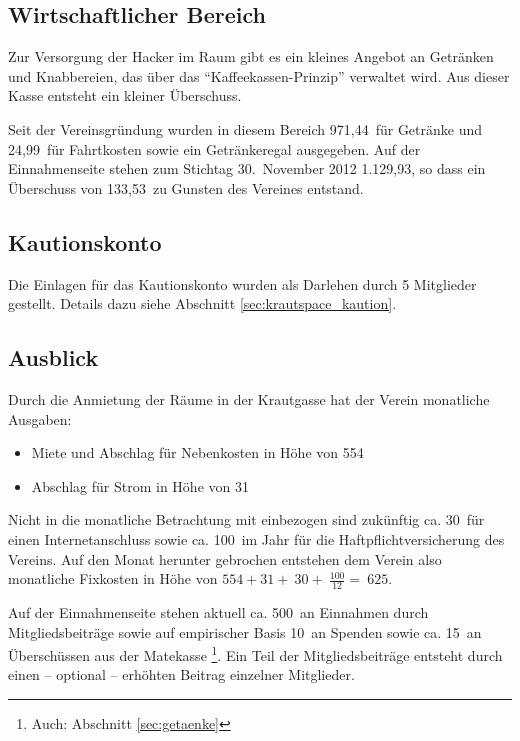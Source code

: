 \documentclass[10pt,DIV16]{scrartcl}
\begin{document}
\subsection{Wirtschaftlicher Bereich}

Zur Versorgung der Hacker im Raum gibt es ein kleines Angebot an
Getränken und Knabbereien, das über das "`Kaffeekassen-Prinzip"'
verwaltet wird. Aus dieser Kasse entsteht ein kleiner Überschuss.

Seit der Vereinsgründung wurden in diesem Bereich 971,44\EUR\ für
Getränke und 24,99\EUR\ für Fahrtkosten sowie ein Getränkeregal
ausgegeben. Auf der Einnahmenseite stehen zum Stichtag 30.~November
2012 1.129,93\EUR, so dass ein Überschuss von 133,53\EUR\ zu Gunsten
des Vereines entstand.

\subsection{Kautionskonto}

Die Einlagen für das Kautionskonto wurden als Darlehen durch 5
Mitglieder gestellt. Details dazu siehe Abschnitt
\ref{sec:krautspace_kaution}.

\subsection{Ausblick}

Durch die Anmietung der Räume in der Krautgasse hat der Verein
monatliche Ausgaben:

\begin{itemize}
	\item Miete und Abschlag für Nebenkosten in Höhe von 554\EUR{}
	\item Abschlag für Strom in Höhe von 31\EUR{}
\end{itemize}

Nicht in die monatliche Betrachtung mit einbezogen sind zukünftig
ca. 30\EUR\ für einen Internetanschluss sowie ca. 100\EUR\ im Jahr
für die Haftpflichtversicherung des Vereins. Auf den Monat herunter
gebrochen entstehen dem Verein also monatliche Fixkosten in Höhe von
$554 + 31 + ~30+ ~\frac{100}{12} = ~625$\EUR.

Auf der Einnahmenseite stehen aktuell ca. 500\EUR\ an Einnahmen
durch Mitgliedsbeiträge sowie auf empirischer Basis 10\EUR\ an
Spenden sowie ca. 15\EUR\ an Überschüssen aus der Matekasse
\footnote{Auch: Abschnitt \ref{sec:getaenke}}. Ein Teil der
Mitgliedsbeiträge entsteht durch einen -- optional -- erhöhten
Beitrag einzelner Mitglieder.
\end{document}
